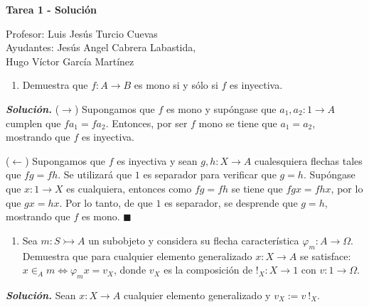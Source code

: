 \documentclass[12pt]{article}
\newcounter{A}
\newenvironment{ejercicio}{\begin{enumerate}[\bfseries \text{EJ \theA}.]\item}{\end{enumerate}\stepcounter{A}}
\newcommand{\QED}{\hfill\ensuremath{\blacksquare}}
\begin{document}
	\begin{center}
		\Huge \textbf{Tarea 1 - Solución}
	\end{center}
    \begin{flushright}
        \footnotesize Profesor: Luis Jesús Turcio Cuevas \\
		Ayudantes: Jesús Angel Cabrera Labastida, \\
		Hugo Víctor García Martínez
	\end{flushright}
    \normalsize

    \begin{ejercicio}
        Demuestra que \(f\colon A\to B\) es mono si y sólo si \(f\) es inyectiva.
    \end{ejercicio}

    \textbf{\textit{Solución.}} (\(\to\)) Supongamos que \(f\) es mono y supóngase que \(a_1,a_2 \colon 1 \to A\) cumplen que \(fa_1 = fa_2\). Entonces, por ser \(f\) mono se tiene que \(a_1 = a_2\), mostrando que \(f\) es inyectiva.

    (\(\leftarrow\)) Supongamos que \(f\) es inyectiva y sean \(g,h \colon X \to A\) cualesquiera flechas tales que \(fg = fh\). Se utilizará que \(1\) es separador para verificar que \(g=h\). Supóngase que \(x \colon 1 \to X\) es cualquiera, entonces como \(fg=fh\) se tiene que \(fgx = fhx\), por lo que \(gx = hx\). Por lo tanto, de que \(1\) es separador, se desprende que \(g=h\), mostrando que \(f\) es mono. \QED
    
    \begin{ejercicio}
        Sea \(m\colon S\rightarrowtail A\) un subobjeto y considera su flecha característica \(\varphi_m\colon A\to \Omega\). Demuestra que para cualquier elemento generalizado \(x\colon X\to A\) se satisface: \( x\in_A m \iff \varphi_m x = v_X \), donde \(v_X\) es la composición de \(!_X\colon X\to 1\) con \(v\colon 1\to \Omega\).
    \end{ejercicio}

    \textbf{\textit{Solución.}} Sean \(x: X \to A\) cualquier elemento generalizado y $v_X:=v \: !_X$.
\end{document}
